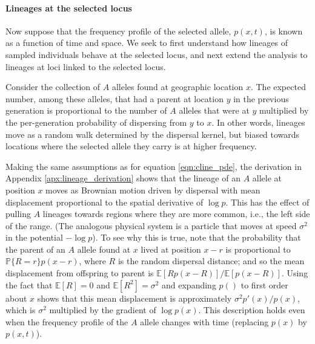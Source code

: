 \documentclass[11pt,letterpaper]{article}
\newcommand{\alisa}[1]{{\em \color{red} #1}}
\newcommand{\plr}[1]{{\em \color{blue} #1}}
\newcommand{\E}{\mathbb{E}}
\renewcommand{\P}{\mathbb{P}}
\newcommand{\grad}{\nabla}
\begin{document}
\paragraph{Lineages at the selected locus}
Now suppose that the frequency profile of the selected allele, $p(x,t)$, is known as a function of time and space.
We seek to first understand how lineages of sampled individuals behave at the selected locus,
and next extend the analysis to lineages at loci linked to the selected locus. 

Consider the collection of $A$ alleles found at geographic location $x$.
The expected number, among these alleles, that had a parent at location $y$ in the previous generation 
is proportional to the number of $A$ alleles that were at $y$ multiplied by the per-generation probability of dispersing from $y$ to $x$. 
In other words, lineages move as a random walk determined by the dispersal kernel,
but biased towards locations where the selected allele they carry is at higher frequency.

Making the same assumptions as for equation \eqref{eqn:cline_pde}, the derivation in Appendix \ref{apx:lineage_derivation} shows 
that the lineage of an $A$ allele at position $x$ moves as Brownian motion driven by dispersal
with mean displacement proportional to the spatial derivative of $\log p$.
This has the effect of pulling $A$ lineages towards regions where they are more common, i.e., the left side of the range.   
(The analogous physical system is a particle that moves at speed $\sigma^2$ in the potential $-\log p$). 
To see why this is true, note that the probability that the parent of an $A$ allele found at $x$
lived at position $x-r$ is proportional to $\P\{R=r\} p(x-r)$, where $R$ is the random dispersal distance;
and so the mean displacement from offspring to parent is $\E[R p(x-R)]/\E[p(x-R)]$.  
Using the fact that $\E[R]=0$ and $\E[R^2]=\sigma^2$ 
and expanding $p()$ to first order about $x$ shows that this mean displacement is approximately $\sigma^2 p'(x)/p(x)$,
which is $\sigma^2$ multiplied by the gradient of $\log p(x)$.
This description holds even when the frequency profile of the $A$ allele changes with time (replacing $p(x)$ by $p(x,t)$).
\end{document}
